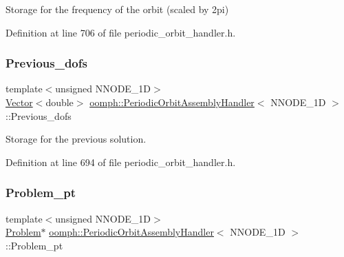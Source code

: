 Storage for the frequency of the orbit (scaled by 2pi) 



Definition at line 706 of file periodic\+\_\+orbit\+\_\+handler.\+h.

\mbox{\label{classoomph_1_1PeriodicOrbitAssemblyHandler_aac4a358fed9397f2ffcb796252f78025}} 
\subsubsection{\texorpdfstring{Previous\+\_\+dofs}{Previous\_dofs}}
{\footnotesize\ttfamily template$<$unsigned N\+N\+O\+D\+E\+\_\+1D$>$ \\
\hyperlink{classoomph_1_1Vector}{Vector}$<$double$>$ \hyperlink{classoomph_1_1PeriodicOrbitAssemblyHandler}{oomph\+::\+Periodic\+Orbit\+Assembly\+Handler}$<$ N\+N\+O\+D\+E\+\_\+1D $>$\+::Previous\+\_\+dofs\hspace{0.3cm}{\ttfamily [private]}}



Storage for the previous solution. 



Definition at line 694 of file periodic\+\_\+orbit\+\_\+handler.\+h.

\mbox{\label{classoomph_1_1PeriodicOrbitAssemblyHandler_ac3a8b481f99a46352f50186a8f9efe4b}} 
\subsubsection{\texorpdfstring{Problem\+\_\+pt}{Problem\_pt}}
{\footnotesize\ttfamily template$<$unsigned N\+N\+O\+D\+E\+\_\+1D$>$ \\
\hyperlink{classoomph_1_1Problem}{Problem}$\ast$ \hyperlink{classoomph_1_1PeriodicOrbitAssemblyHandler}{oomph\+::\+Periodic\+Orbit\+Assembly\+Handler}$<$ N\+N\+O\+D\+E\+\_\+1D $>$\+::Problem\+\_\+pt\hspace{0.3cm}{\ttfamily [private]}}



